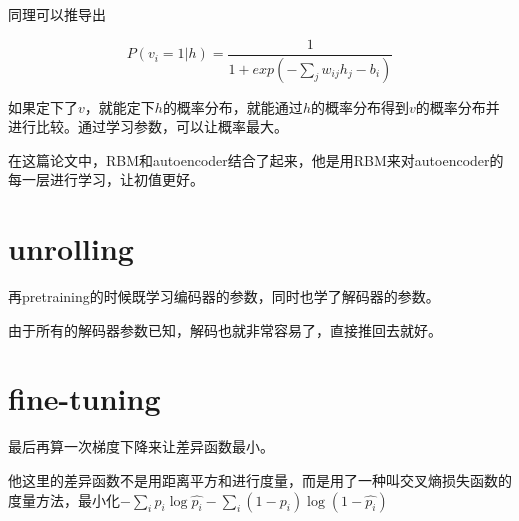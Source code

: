 \documentclass{ctexart}
\begin{document}
同理可以推导出

\[P(v_i=1|h)=\frac{1}{1+exp(-\sum_j w_{ij}h_j-b_i)}\]

如果定下了$v$，就能定下$h$的概率分布，就能通过$h$的概率分布得到$v$的概率分布并进行比较。通过学习参数，可以让概率最大。

在这篇论文中，RBM和autoencoder结合了起来，他是用RBM来对autoencoder的每一层进行学习，让初值更好。
\section{unrolling}
再pretraining的时候既学习编码器的参数，同时也学了解码器的参数。

由于所有的解码器参数已知，解码也就非常容易了，直接推回去就好。
\section{fine-tuning}
最后再算一次梯度下降来让差异函数最小。

他这里的差异函数不是用距离平方和进行度量，而是用了一种叫交叉熵损失函数的度量方法，最小化$-\sum\limits_i p_i \log \hat{p_i} - \sum\limits_i (1-p_i) \log(1-\hat{p_i})$
\end{document}
